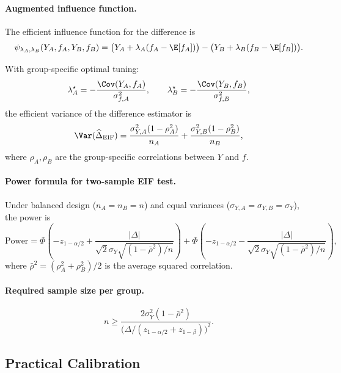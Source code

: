 \paragraph{Augmented influence function.}
The efficient influence function for the difference is
\[
\psi_{\lambda_A, \lambda_B}(Y_A, f_A, Y_B, f_B)
= \big(Y_A + \lambda_A(f_A - \E[f_A])\big) - \big(Y_B + \lambda_B(f_B - \E[f_B])\big).
\]

With group-specific optimal tuning:
\begin{equation}\label{eq:eif-ttest-lambda}
\lambda_A^\star = -\frac{\Cov(Y_A, f_A)}{\sigma_{f,A}^2}, \qquad
\lambda_B^\star = -\frac{\Cov(Y_B, f_B)}{\sigma_{f,B}^2},
\end{equation}
the efficient variance of the difference estimator is
\begin{equation}\label{eq:eif-ttest-var}
\Var(\widehat{\Delta}_{\text{EIF}})
= \frac{\sigma_{Y,A}^2(1 - \rho_A^2)}{n_A} + \frac{\sigma_{Y,B}^2(1 - \rho_B^2)}{n_B},
\end{equation}
where $\rho_A, \rho_B$ are the group-specific correlations between $Y$ and $f$.

\paragraph{Power formula for two-sample EIF test.}
Under balanced design ($n_A = n_B = n$) and equal variances ($\sigma_{Y,A} = \sigma_{Y,B} = \sigma_Y$),
the power is
\begin{equation}\label{eq:eif-ttest-power}
\text{Power} = \Phi\left(-z_{1-\alpha/2} + \frac{|\Delta|}{\sqrt{2}\sigma_Y\sqrt{(1-\bar\rho^2)/n}}\right)
+ \Phi\left(-z_{1-\alpha/2} - \frac{|\Delta|}{\sqrt{2}\sigma_Y\sqrt{(1-\bar\rho^2)/n}}\right),
\end{equation}
where $\bar\rho^2 = (\rho_A^2 + \rho_B^2)/2$ is the average squared correlation.

\paragraph{Required sample size per group.}
\begin{equation}\label{eq:eif-ttest-n}
n \ge \frac{2\sigma_Y^2(1 - \bar\rho^2)}{\big(\Delta / (z_{1-\alpha/2} + z_{1-\beta})\big)^2}.
\end{equation}

\subsection{Practical Calibration}

